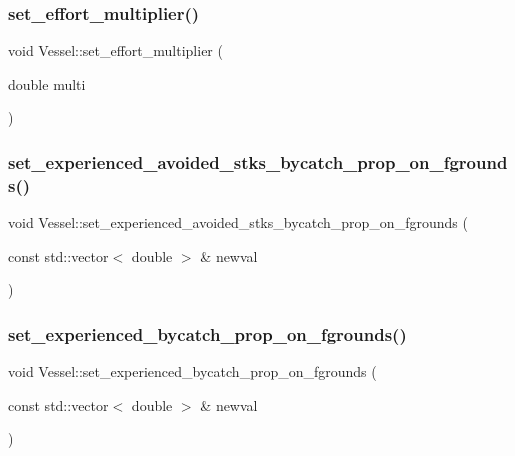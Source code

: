 \subsubsection{\texorpdfstring{set\_effort\_multiplier()}{set\_effort\_multiplier()}}
{\footnotesize\ttfamily void Vessel\+::set\+\_\+effort\+\_\+multiplier (\begin{DoxyParamCaption}\item[{double}]{multi }\end{DoxyParamCaption})}

\mbox{\label{class_vessel_a2743eb832b551f826823b6fd59b28e69}} 
\subsubsection{\texorpdfstring{set\_experienced\_avoided\_stks\_bycatch\_prop\_on\_fgrounds()}{set\_experienced\_avoided\_stks\_bycatch\_prop\_on\_fgrounds()}}
{\footnotesize\ttfamily void Vessel\+::set\+\_\+experienced\+\_\+avoided\+\_\+stks\+\_\+bycatch\+\_\+prop\+\_\+on\+\_\+fgrounds (\begin{DoxyParamCaption}\item[{const std\+::vector$<$ double $>$ \&}]{newval }\end{DoxyParamCaption})}

\mbox{\label{class_vessel_aba80164386a57e07c962cb075a7ee636}} 
\subsubsection{\texorpdfstring{set\_experienced\_bycatch\_prop\_on\_fgrounds()}{set\_experienced\_bycatch\_prop\_on\_fgrounds()}}
{\footnotesize\ttfamily void Vessel\+::set\+\_\+experienced\+\_\+bycatch\+\_\+prop\+\_\+on\+\_\+fgrounds (\begin{DoxyParamCaption}\item[{const std\+::vector$<$ double $>$ \&}]{newval }\end{DoxyParamCaption})}

